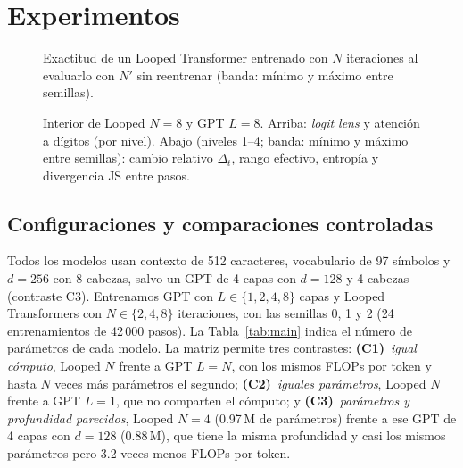 \section{Experimentos}
\label{sec:experimentos}

\begin{table}[!t]
\centering\small
\setlength{\tabcolsep}{4pt}

\caption{Exactitud (\%) por nivel, media $\pm$ desviación típica sobre tres
semillas (niveles 1--4: test en distribución; 5 y 6: fuera de distribución;
\emph{Plant. nuevas}: redacciones no vistas). En negrita, la mejor media.}
\label{tab:main}
\end{table}

\begin{figure}[!t]
\centering
{}
\caption{Exactitud de un Looped Transformer entrenado con $N$ iteraciones al
evaluarlo con $N'$ sin reentrenar (banda: mínimo y máximo entre semillas).}
\label{fig:sweep}
\end{figure}

\begin{figure}[!t]
\centering
{}
\caption{Interior de Looped $N{=}8$ y GPT $L{=}8$. Arriba: \emph{logit lens} y atención a dígitos (por nivel). Abajo (niveles 1--4; banda: mínimo y máximo entre semillas): cambio relativo $\Delta_t$, rango efectivo, entropía y divergencia JS entre pasos.}
\label{fig:interno}
\end{figure}

\subsection{Configuraciones y comparaciones controladas}

Todos los modelos usan contexto de 512 caracteres, vocabulario de 97 símbolos y
$d{=}256$ con 8 cabezas, salvo un GPT de 4 capas con $d{=}128$ y 4 cabezas
(contraste C3). Entrenamos GPT con
$L\in\{1,2,4,8\}$ capas y Looped Transformers con $N\in\{2,4,8\}$ iteraciones,
con las semillas 0, 1 y 2 (24 entrenamientos de 42\,000 pasos).
La Tabla~\ref{tab:main} indica el número de parámetros de cada modelo. La matriz
permite tres contrastes: \textbf{(C1)}~\emph{igual cómputo}, Looped $N$ frente a GPT
$L{=}N$, con los mismos FLOPs por token y hasta $N$ veces más parámetros el segundo;
\textbf{(C2)}~\emph{iguales parámetros}, Looped $N$ frente a GPT $L{=}1$, que no
comparten el cómputo; y \textbf{(C3)}~\emph{parámetros y profundidad parecidos},
Looped $N{=}4$ (0.97\,M de parámetros) frente a ese GPT de 4 capas con $d{=}128$
(0.88\,M), que tiene la misma profundidad y casi los mismos parámetros pero 3.2
veces menos FLOPs por token.

